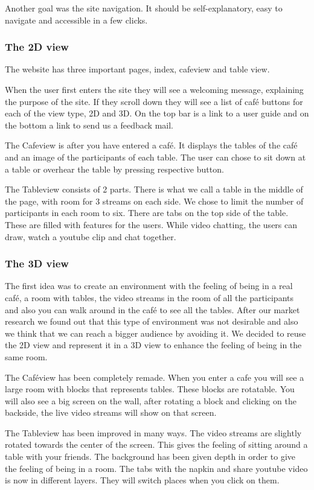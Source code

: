 \documentclass[12pt, titlepage]{article}
\begin{document}
Another goal was the site navigation. It should be self-explanatory, easy to navigate and accessible in a few clicks.
\subsubsection{The 2D view}
The website has three important pages, index, cafeview and table view.

When the user first enters the site they will see a welcoming message, explaining the purpose of the site. If they scroll down they will see a list of café buttons for each of the view type, 2D and 3D. On the top bar is a link to a user guide and on the bottom a link to send us a feedback mail.

The Cafeview is after you have entered a café. It displays the tables of the café and an image of the participants of each table. The user can chose to sit down at a table or overhear the table by pressing respective button.

The Tableview consists of 2 parts. There is what we call a table in the middle of the page, with room for 3 streams on each side. We chose to limit the number of participants in each room to six. There are tabs on the top side of the table. These are filled with features for the users. While video chatting, the users can draw, watch a youtube clip and chat together. 
\subsubsection{The 3D view}
The first idea was to create an environment with the feeling of being in a real café, a room with tables, the video streams in the room of all the participants and also you can walk around in the café to see all the tables. After our market research we found out that this type of environment was not desirable and also we think that we can reach a bigger audience by avoiding it. We decided to reuse the 2D view and represent it in a 3D view to enhance the feeling of being in the same room. 

The Caféview has been completely remade. When you enter a cafe you will see a large room with blocks that represents tables. These blocks are rotatable. You will also see a big screen on the wall, after rotating a block and clicking on the backside,  the live video streams will show on that screen.

The Tableview has been improved in many ways. The video streams are slightly rotated towards the center of the screen. This gives the feeling of sitting around a table with your friends. The background has been given depth in order to give the feeling of being in a room. The tabs with the napkin and share youtube video is now in different layers. They will switch places when you click on them.
\end{document}
